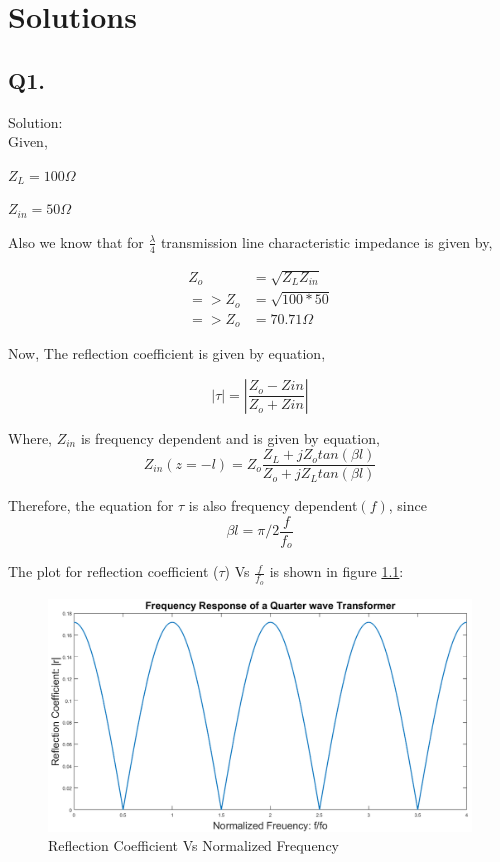 \chapter{Solutions}\label{chap1}

\section{Q1.} %
Solution:\\

Given,

$Z_L = 100 \Omega$

$Z_{in} = 50 \Omega$

Also we know that for $\frac{\lambda}{4}$ transmission line characteristic impedance is given by,

\begin{align*} 
Z_o & = \sqrt{Z_L Z_{in}}\\
=> Z_o &= \sqrt{100*50}\\
=> Z_o &= 70.71 \Omega
\end{align*}

Now, The reflection coefficient is given by equation,

$$ \left| \tau \right| = \left| \frac{Z_o - Z{in}}{Z_o + Z{in}}\right|$$

Where, $Z_{in}$ is frequency dependent and is given by equation,
$$Z_{in}(z = -l) = Z_o\frac{Z_L+jZ_o tan(\beta l)}{Z_o+jZ_L tan(\beta l)}$$

Therefore, the equation for $\tau$ is also frequency dependent$(f)$, since
$$\beta l = \pi/2 \frac{f}{f_o}$$

\newpage
The plot for reflection coefficient ($\tau$) Vs $\frac{f}{f_o}$ is shown in figure \ref{q1}:
\begin{figure}[!ht]
	\centering
	\includegraphics[scale=0.45]{q1.png}
	\caption{\label{q1} Reflection Coefficient Vs Normalized Frequency}
\end{figure}

